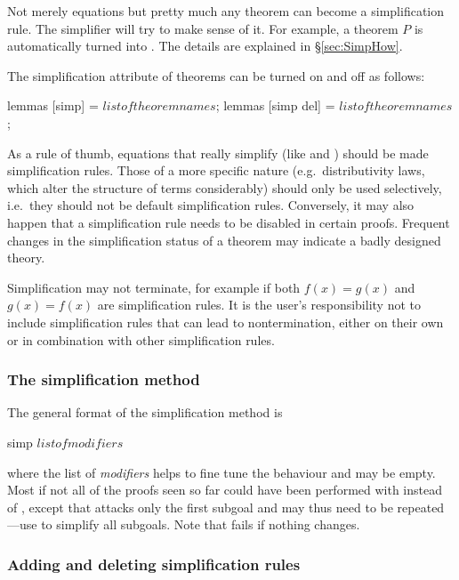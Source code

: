 Not merely equations but pretty much any theorem can become a simplification
rule. The simplifier will try to make sense of it.  For example, a theorem
\isasymnot$P$ is automatically turned into . The details
are explained in \S\ref{sec:SimpHow}.

The simplification attribute of theorems can be turned on and off as follows:
\begin{ttbox}
lemmas [simp] = \(list of theorem names\);
lemmas [simp del] = \(list of theorem names\);
\end{ttbox}
As a rule of thumb, equations that really simplify (like  and \mbox{}) should be made simplification
rules.  Those of a more specific nature (e.g.\ distributivity laws, which
alter the structure of terms considerably) should only be used selectively,
i.e.\ they should not be default simplification rules.  Conversely, it may
also happen that a simplification rule needs to be disabled in certain
proofs.  Frequent changes in the simplification status of a theorem may
indicate a badly designed theory.
\begin{warn}
  Simplification may not terminate, for example if both $f(x) = g(x)$ and
  $g(x) = f(x)$ are simplification rules. It is the user's responsibility not
  to include simplification rules that can lead to nontermination, either on
  their own or in combination with other simplification rules.
\end{warn}

\subsubsection{The simplification method}

The general format of the simplification method is
\begin{ttbox}
simp \(list of modifiers\)
\end{ttbox}
where the list of \emph{modifiers} helps to fine tune the behaviour and may
be empty. Most if not all of the proofs seen so far could have been performed
with  instead of , except that  attacks
only the first subgoal and may thus need to be repeated---use 
to simplify all subgoals.
Note that  fails if nothing changes.

\subsubsection{Adding and deleting simplification rules}

